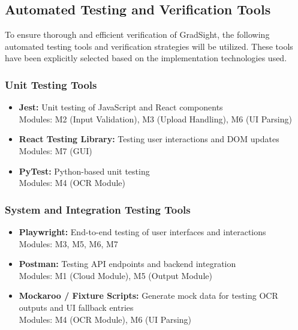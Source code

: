 \documentclass[12pt, titlepage]{article}
\begin{document}
\subsection{Automated Testing and Verification Tools}

To ensure thorough and efficient verification of GradSight, the following automated testing tools and verification strategies will be utilized. These tools have been explicitly selected based on the implementation technologies used.

\subsubsection*{Unit Testing Tools}
\begin{itemize}
  \item \textbf{Jest:} Unit testing of JavaScript and React components\\
  Modules: M2 (Input Validation), M3 (Upload Handling), M6 (UI Parsing)

  \item \textbf{React Testing Library:} Testing user interactions and DOM updates\\
  Modules: M7 (GUI)

  \item \textbf{PyTest:} Python-based unit testing\\
  Modules: M4 (OCR Module)
\end{itemize}

\subsubsection*{System and Integration Testing Tools}
\begin{itemize}
  \item \textbf{Playwright:} End-to-end testing of user interfaces and interactions\\
  Modules: M3, M5, M6, M7

  \item \textbf{Postman:} Testing API endpoints and backend integration\\
  Modules: M1 (Cloud Module), M5 (Output Module)

  \item \textbf{Mockaroo / Fixture Scripts:} Generate mock data for testing OCR outputs and UI fallback entries\\
  Modules: M4 (OCR Module), M6 (UI Parsing)
\end{itemize}
\end{document}
